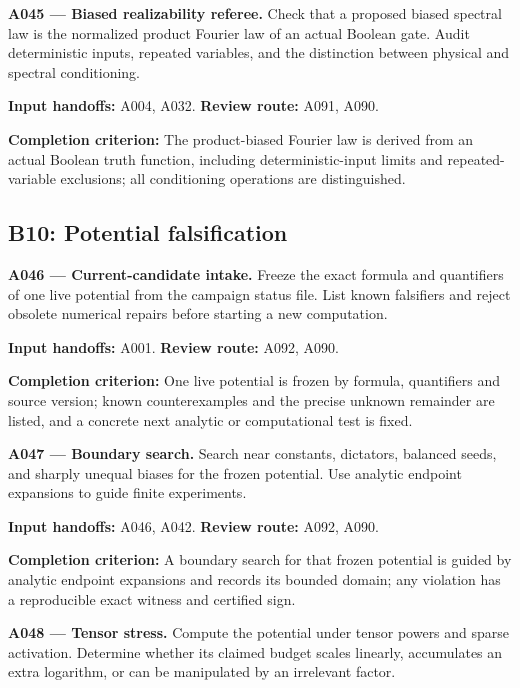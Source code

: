 \documentclass[11pt]{article}
\begin{document}
\textbf{A045 --- Biased realizability referee.} Check that a proposed biased spectral law is the normalized product Fourier law of an actual Boolean gate. Audit deterministic inputs, repeated variables, and the distinction between physical and spectral conditioning.

{\small\color{ink}\textbf{Input handoffs:} A004, A032. \textbf{Review route:} A091, A090.\par
\textbf{Completion criterion:} The product-biased Fourier law is derived from an actual Boolean truth function, including deterministic-input limits and repeated-variable exclusions; all conditioning operations are distinguished.\par}



\subsection{B10: Potential falsification}

\textbf{A046 --- Current-candidate intake.} Freeze the exact formula and quantifiers of one live potential from the campaign status file. List known falsifiers and reject obsolete numerical repairs before starting a new computation.

{\small\color{ink}\textbf{Input handoffs:} A001. \textbf{Review route:} A092, A090.\par
\textbf{Completion criterion:} One live potential is frozen by formula, quantifiers and source version; known counterexamples and the precise unknown remainder are listed, and a concrete next analytic or computational test is fixed.\par}



\textbf{A047 --- Boundary search.} Search near constants, dictators, balanced seeds, and sharply unequal biases for the frozen potential. Use analytic endpoint expansions to guide finite experiments.

{\small\color{ink}\textbf{Input handoffs:} A046, A042. \textbf{Review route:} A092, A090.\par
\textbf{Completion criterion:} A boundary search for that frozen potential is guided by analytic endpoint expansions and records its bounded domain; any violation has a reproducible exact witness and certified sign.\par}



\textbf{A048 --- Tensor stress.} Compute the potential under tensor powers and sparse activation. Determine whether its claimed budget scales linearly, accumulates an extra logarithm, or can be manipulated by an irrelevant factor.
\end{document}
